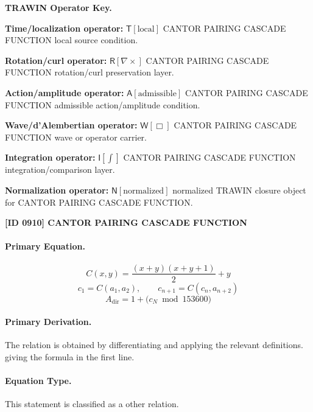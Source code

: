 \par\vspace{0.45\baselineskip}
\noindent\begin{minipage}[t]{\linewidth}
\begingroup
\small
\raggedright
\textbf{TRAWIN Operator Key.}\par
\noindent\textbf{Time/localization operator:} $\mathsf{T}\!\left[\mathrm{local}\right]$ CANTOR PAIRING CASCADE FUNCTION local source condition.\par
\noindent\textbf{Rotation/curl operator:} $\mathsf{R}\!\left[\nabla\times\right]$ CANTOR PAIRING CASCADE FUNCTION rotation/curl preservation layer.\par
\noindent\textbf{Action/amplitude operator:} $\mathsf{A}\!\left[\mathrm{admissible}\right]$ CANTOR PAIRING CASCADE FUNCTION admissible action/amplitude condition.\par
\noindent\textbf{Wave/d'Alembertian operator:} $\mathsf{W}\!\left[\Box\right]$ CANTOR PAIRING CASCADE FUNCTION wave or operator carrier.\par
\noindent\textbf{Integration operator:} $\mathsf{I}\!\left[\int\right]$ CANTOR PAIRING CASCADE FUNCTION integration/comparison layer.\par
\noindent\textbf{Normalization operator:} $\mathsf{N}\!\left[\mathrm{normalized}\right]$ normalized TRAWIN closure object for CANTOR PAIRING CASCADE FUNCTION.\par
\endgroup
\end{minipage}

\clearpage
\noindent\textbf{[ID 0910] CANTOR PAIRING CASCADE FUNCTION}\par
\vspace{0.35em}
\paragraph{Primary Equation.}
\[
C(x,y)=\frac{(x+y)(x+y+1)}{2}+y
\]
\[
c_1=C(a_1,a_2),\qquad c_{n+1}=C(c_n,a_{n+2})
\]
\[
A_{\mathrm{dir}}=1+\bigl(c_N \bmod 153600\bigr)
\]

\paragraph{Primary Derivation.}
The relation is obtained by differentiating and applying the relevant definitions. giving the formula in the first line.
\paragraph{Equation Type.}
This statement is classified as a other relation.

